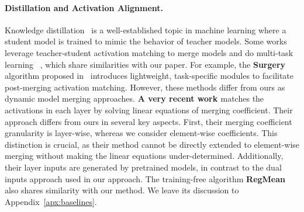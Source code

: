 \paragraph{Distillation and Activation Alignment.}
Knowledge distillation~\citep{hinton2015distilling,romero2014fitnets,yim2017gift} is a well-established topic in machine learning where a student model is trained to mimic the behavior of teacher models.
Some works leverage teacher-student activation matching to merge models and do multi-task learning ~\citep{li2020knowledge, ghiasi2021multi,yang2022factorizing,jin2022dataless,kong2024rethink,zhang2024knowledge,nasery2024pleas}, which share similarities with our paper. 
For example, the \textbf{Surgery} algorithm proposed in~\citep{yang2024representation, yang2024surgeryv2}  introduces lightweight, task-specific modules to facilitate post-merging activation matching. However, these methods differ from ours as dynamic model merging approaches.
\textbf{A very recent work \citet{anonymous2024leveraging}} matches the activations in each layer by solving linear equations of merging coefficient. Their approach differs from ours in several key aspects. 
First, their merging coefficient granularity is layer-wise, whereas we consider element-wise coefficients. This distinction is crucial, as their method cannot be directly extended to element-wise merging without making the linear equations under-determined.  Additionally, their layer inputs are generated by pretrained models, in contrast to the dual inputs approach used in our approach. 
The training-free algorithm \textbf{RegMean}~\citep{jin2022dataless} also shares similarity with our method. We leave its discussion to Appendix~\ref{apx:baselines}.